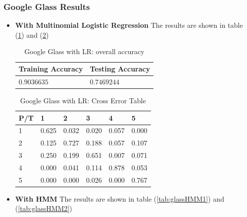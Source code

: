 \subsubsection{Google Glass Results}
\label{sec:glassresult}
\begin{itemize}
\item \textbf{With Multinomial Logistic Regression} 
The results are shown in table (\ref{tab:glassLR1}) and (\ref{tab:glassLR2})

\begin{table}[h]
\begin{center}
\begin{tabular}{|l|l|}
      \hline
      Training Accuracy & Testing Accuracy\\
      \hline
      $0.9036635$ & $0.7469244$ \\
      \hline
\end{tabular}
\caption{Google Glass with LR: overall accuracy}
\label{tab:glassLR1}
\end{center}
\end{table}

\begin{table}[h]
\begin{center}
\begin{tabular}{|l|l|l|l|l|l|}
      \hline
      P/T& 1 & 2 &3 & 4 & 5 \\
      \hline
      1 &0.625&0.032&0.020&0.057&0.000\\
      2 &0.125&0.727&0.188&0.057&0.107\\
      3 &0.250&0.199&0.651&0.007&0.071\\
      4 &0.000&0.041&0.114&0.878&0.053\\
      5 & 0.000&0.000&0.026&0.000&0.767\\
      \hline
\end{tabular}
\caption{Google Glass with LR: Cross Error Table}
\label{tab:glassLR2}
\end{center}
\end{table}
\item \textbf{With HMM}
The results are shown in table (\ref{tab:glassHMM1}) and (\ref{tab:glassHMM2})


\end{itemize}
